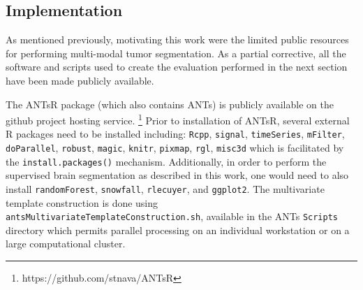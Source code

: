 \documentclass{llncs}
\begin{document}
\subsection{Implementation}

As mentioned previously, motivating this work were the limited public resources
for performing multi-modal tumor segmentation.  As a partial corrective, all the
software and scripts used to create the evaluation performed in the next section have been made publicly available.  

The ANTsR package (which also contains ANTs) is publicly available on the github project hosting service.%
\footnote{
https://github.com/stnava/ANTsR
}
Prior to installation of ANTsR, several external R packages
need to be installed including: \verb#Rcpp#, \verb#signal#, \verb#timeSeries#, 
\verb#mFilter#, \verb#doParallel#, \verb#robust#, \verb#magic#, \verb#knitr#, \verb#pixmap#, 
\verb#rgl#, \verb#misc3d# which is facilitated by the 
\verb#install.packages()# mechanism.  Additionally, in order
to perform the supervised brain segmentation as described 
in this work, one would need to also install 
\verb#randomForest#, \verb#snowfall#, \verb#rlecuyer#, and \verb#ggplot2#. 
The multivariate template construction is done using \verb#antsMultivariateTemplateConstruction.sh#, available in the ANTs \verb#Scripts# directory which permits parallel processing on
an individual workstation or on a large computational cluster.
\end{document}
